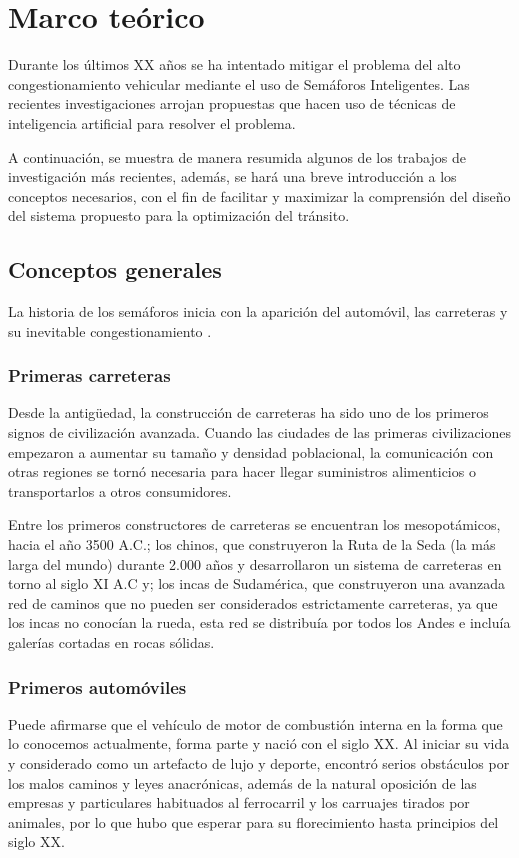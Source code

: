 \chapter{Marco teórico}
Durante los últimos XX años se ha intentado mitigar el problema del alto congestionamiento vehicular mediante el uso de Semáforos Inteligentes. Las recientes investigaciones arrojan propuestas que hacen uso  de técnicas de inteligencia artificial para resolver el problema.

A continuación, se muestra de manera resumida algunos de los trabajos de investigación más recientes, además, se hará una breve introducción a los conceptos necesarios, con el fin de facilitar y maximizar la comprensión del diseño del sistema propuesto para la optimización del tránsito.

\section{Conceptos generales}

La historia de los semáforos inicia con la aparición del automóvil, las carreteras y su inevitable congestionamiento \cite{arandia}.

\subsection{Primeras carreteras}
Desde la antigüedad, la construcción de carreteras ha sido uno de los primeros signos de civilización avanzada. Cuando las ciudades de las primeras civilizaciones empezaron a aumentar su tamaño y densidad poblacional, la comunicación con otras regiones se tornó necesaria para hacer llegar suministros alimenticios o transportarlos a otros consumidores.

Entre los primeros constructores de carreteras se encuentran los mesopotámicos, hacia el año 3500 A.C.; los chinos, que construyeron la Ruta de la Seda (la más larga del mundo) durante 2.000 años y desarrollaron un sistema de carreteras en torno al siglo XI A.C y; los incas de Sudamérica, que construyeron una avanzada red de caminos que no pueden ser considerados estrictamente carreteras, ya que los incas no conocían la rueda, esta red se distribuía por todos los Andes e incluía galerías cortadas en rocas sólidas.

\subsection{Primeros automóviles}
Puede afirmarse que el vehículo de motor de combustión interna en la forma que lo conocemos actualmente, forma parte y nació con el siglo XX.
Al iniciar su vida y considerado como un artefacto de lujo y deporte, encontró serios obstáculos por los malos caminos y leyes anacrónicas, además de la natural oposición de las empresas y particulares habituados al ferrocarril y los carruajes tirados por animales, por lo que hubo que esperar para su florecimiento hasta principios del siglo XX.

